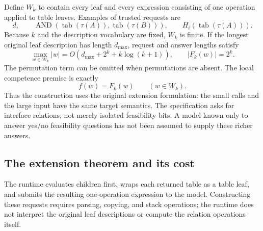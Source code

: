 \documentclass[11pt,twoside]{article}
\newcommand{\tab}{\operatorname{tab}}
\theoremstyle{definition}
\theoremstyle{remark}
\begin{document}
Define $W_k$ to contain every leaf and every expression consisting of one
operation applied to table leaves. Examples of trusted requests are
\begin{equation}
 d,\qquad \operatorname{AND}(\tab(\tau(A)),\tab(\tau(B))),\qquad
 H_i(\tab(\tau(A))).
 \label{eq:trusted-examples}
\end{equation}
Because $k$ and the description vocabulary are fixed, $W_k$ is finite.
If the longest original leaf description has length $d_{\max}$, request and
answer lengths satisfy
\begin{equation}
 \max_{w\in W_k}|w|=O(d_{\max}+2^k+k\log(k+1)),
 \qquad |F_k(w)|=2^k.
 \label{eq:relation-call-size}
\end{equation}
The permutation term can be omitted when permutations are absent.
The local competence premise is exactly
\begin{equation}
 f(w)=F_k(w)\qquad(w\in W_k).
 \label{eq:relation-competence}
\end{equation}
Thus the construction uses the original extension formulation: the small
calls and the large input have the same target semantics. The specification
asks for interface relations, not merely isolated feasibility bits. A
model known only to answer yes/no feasibility questions has not been assumed
to supply these richer answers.

\subsection{The extension theorem and its cost}

The runtime evaluates children first, wraps each returned table as a table
leaf, and submits the resulting one-operation expression to the model.
Constructing these requests requires parsing, copying, and stack operations;
the runtime does not interpret the original leaf descriptions or compute
the relation operations itself.
\end{document}
